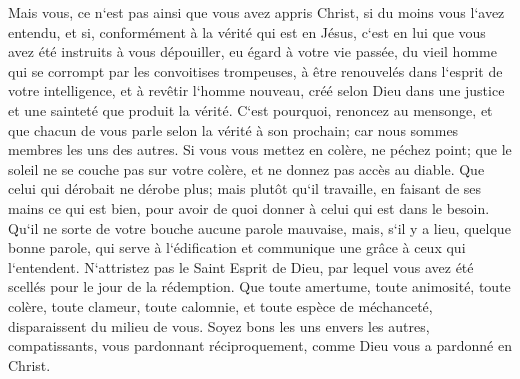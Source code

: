 \verse Mais vous, ce n`est pas ainsi que vous avez appris Christ, 
\verse si du moins vous l`avez entendu, et si, conformément à la vérité qui est en Jésus, c`est en lui que vous avez été instruits à vous dépouiller, 
\verse eu égard à votre vie passée, du vieil homme qui se corrompt par les convoitises trompeuses, 
\verse à être renouvelés dans l`esprit de votre intelligence, 
\verse et à revêtir l`homme nouveau, créé selon Dieu dans une justice et une sainteté que produit la vérité. 
\verse C`est pourquoi, renoncez au mensonge, et que chacun de vous parle selon la vérité à son prochain; car nous sommes membres les uns des autres. 
\verse Si vous vous mettez en colère, ne péchez point; que le soleil ne se couche pas sur votre colère, 
\verse et ne donnez pas accès au diable. 
\verse Que celui qui dérobait ne dérobe plus; mais plutôt qu`il travaille, en faisant de ses mains ce qui est bien, pour avoir de quoi donner à celui qui est dans le besoin. 
\verse Qu`il ne sorte de votre bouche aucune parole mauvaise, mais, s`il y a lieu, quelque bonne parole, qui serve à l`édification et communique une grâce à ceux qui l`entendent. 
\verse N`attristez pas le Saint Esprit de Dieu, par lequel vous avez été scellés pour le jour de la rédemption. 
\verse Que toute amertume, toute animosité, toute colère, toute clameur, toute calomnie, et toute espèce de méchanceté, disparaissent du milieu de vous. 
\verse Soyez bons les uns envers les autres, compatissants, vous pardonnant réciproquement, comme Dieu vous a pardonné en Christ. 


